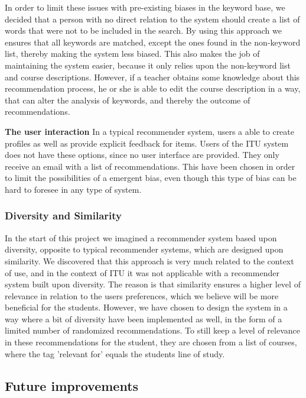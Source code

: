 In order to limit these issues with pre-existing biases in the keyword base, we decided that a person with no direct relation to the system should create a list of words that were not to be included in the search. By using this approach we ensures that all keywords are matched, except the ones found in the non-keyword list, thereby making the system less biased.
This also makes the job of maintaining the system easier, because it only relies upon the non-keyword list and course descriptions.\newline
However, if a teacher obtains some knowledge about this recommendation process, he or she is able to edit the course description in a way, that can alter the analysis of keywords, and thereby the outcome of recommendations.\newline

\textbf{The user interaction}\newline
In a typical recommender system, users a able to create profiles as well as provide explicit feedback for items. Users of the ITU system does not have these options, since no user interface are provided. They only receive an email with a list of recommendations. This have been chosen in order to limit the possibilities of a emergent bias, even though this type of bias can be hard to foresee in any type of system.


\subsubsection{Diversity and Similarity}
In the start of this project we imagined a recommender system based upon diversity, opposite to typical recommender systems, which are designed upon similarity.\newline
We discovered that this approach is very much related to the context of use, and in the context of ITU it was not applicable with a recommender system built upon diversity. The reason is that similarity ensures a higher level of relevance in relation to the users preferences, which we believe will be more beneficial for the students. However, we have chosen to design the system in a way where a bit of diversity have been implemented as well, in the form of a limited number of randomized recommendations. To still keep a level of relevance in these recommendations for the student, they are chosen from a list of courses, where the tag 'relevant for' equals the students line of study.

\subsection{Future improvements}
